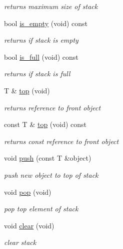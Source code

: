 \begin{DoxyCompactItemize}
\begin{DoxyCompactList}\small\item\em returns maximum size of stack \end{DoxyCompactList}\item 
bool \hyperlink{classcrap_1_1static__stack_a50b7dac79d2a44937463cf32bfe3ba24}{is\-\_\-empty} (void) const 
\begin{DoxyCompactList}\small\item\em returns if stack is empty \end{DoxyCompactList}\item 
bool \hyperlink{classcrap_1_1static__stack_a92b967247a7a5d515d45a130f65b4d06}{is\-\_\-full} (void) const 
\begin{DoxyCompactList}\small\item\em returns if stack is full \end{DoxyCompactList}\item 
T \& \hyperlink{classcrap_1_1static__stack_acb5592dd4569da537d9b83e5f01be9a3}{top} (void)
\begin{DoxyCompactList}\small\item\em returns reference to front object \end{DoxyCompactList}\item 
const T \& \hyperlink{classcrap_1_1static__stack_a65067039b14027a4f9de84c3777408f1}{top} (void) const 
\begin{DoxyCompactList}\small\item\em returns const reference to front object \end{DoxyCompactList}\item 
void \hyperlink{classcrap_1_1static__stack_aad405e79112eda4558f5758da01bb8f3}{push} (const T \&object)
\begin{DoxyCompactList}\small\item\em push new object to top of stack \end{DoxyCompactList}\item 
void \hyperlink{classcrap_1_1static__stack_a9d0564eb1707f2e470ba2ee7b3e965ff}{pop} (void)
\begin{DoxyCompactList}\small\item\em pop top element of stack \end{DoxyCompactList}\item 
void \hyperlink{classcrap_1_1static__stack_aaa488bb2ed8979506bd4704ec1da8d37}{clear} (void)
\begin{DoxyCompactList}\small\item\em clear stack \end{DoxyCompactList}\end{DoxyCompactItemize}
